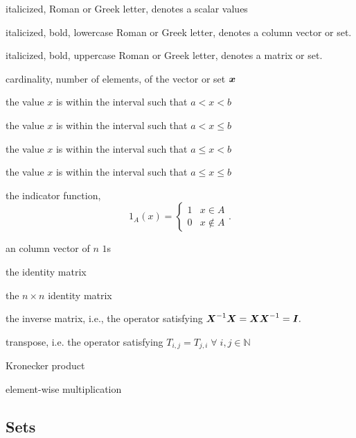 \begin{description}[leftmargin=!, labelwidth=0.7in]
  \item[$x$]             italicized, Roman or Greek letter, denotes a scalar values 
  \item[$\bs{x}$]        italicized, bold, lowercase Roman or Greek letter, denotes a column vector or set.
  \item[$\bs{X}$]        italicized, bold, uppercase Roman or Greek letter, denotes a matrix or set.
  \item[$\card{\bs{x}}$] cardinality, number of elements, of the vector or set $\bs{x}$ 
  \item[$x \in (a, b)$]  the value $x$ is within the interval such that $a < x < b$
  \item[{$x \in (a, b]$}]  the value $x$ is within the interval such that $a < x \leq b$
  \item[$x \in [a, b)$]  the value $x$ is within the interval such that $a \leq x < b$
  \item[{$x \in [a, b]$}]  the value $x$ is within the interval such that $a \leq x \leq b$ 
  \item[$1_{A}\left(x\right)$] the indicator function,\[1_{A}\left(x \right) = \begin{cases} 1 & x \in A \\ 0 & x \notin A \end{cases}.\] 
  \item[$\bs{1}_n$] an column vector of $n$ $1$s
  \item[$\bs{I}$] the identity matrix
  \item[$\bs{I}_n$] the $n \times n$ identity matrix
  \item[$\bs{X}^{-1}$] the inverse matrix, i.e., the operator satisfying $\boldsymbol{X}^{-1} \boldsymbol{X} = \boldsymbol{X} \boldsymbol{X}^{-1} = \boldsymbol{I}.$
  \item[$\bs{X}^{T}$] transpose, i.e. the operator satisfying $T_{i,j} = T_{j, i} \; \forall \; i,j \in \mathbb{N}$
  \item[$\otimes$] Kronecker product
  \item[$\odot$] element-wise multiplication
\end{description}

\subsection{Sets}

